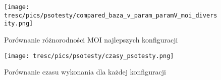 \begin{figure}[H]
\begin{center} 
\texttt{[image: tresc/pics/psotesty/compared\_baza\_v\_param\_paramV\_moi\_diversity.png]}
\caption{Porównanie różnorodności MOI najlepszych konfiguracji}
\label{fig:compared_baza_v_randV_paramV_moi_diversity}
\end{center}
\end{figure}


\begin{figure}[H]
\begin{center} 
\texttt{[image: tresc/pics/psotesty/czasy\_psotesty.png]}
\caption{Porównanie czasu wykonania dla każdej konfiguracji}
\label{fig:czasy_psotesty}
\end{center}
\end{figure}


